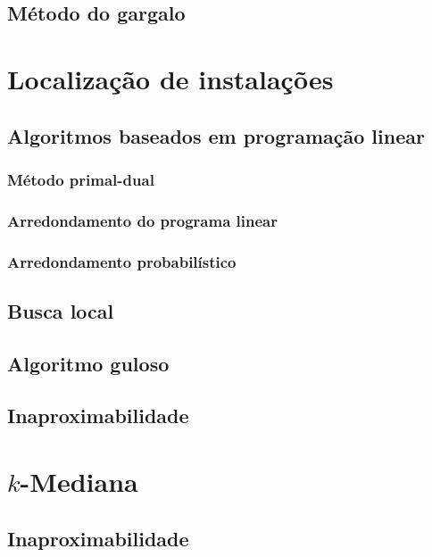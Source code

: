 \documentclass[12pt]{article}
\begin{document}
\subsection{Método do gargalo}
    

\section{Localização de instalações}
    

\subsection{Algoritmos baseados em programação linear}
    

\subsubsection{Método primal-dual}
    

\subsubsection{Arredondamento do programa linear}
    

\subsubsection{Arredondamento probabilístico}
    

\subsection{Busca local}
    

\subsection{Algoritmo guloso}
    

\subsection{Inaproximabilidade}
    
    
\section{$k$-Mediana}
    

\subsection{Inaproximabilidade}
    
\newpage


\end{document}
